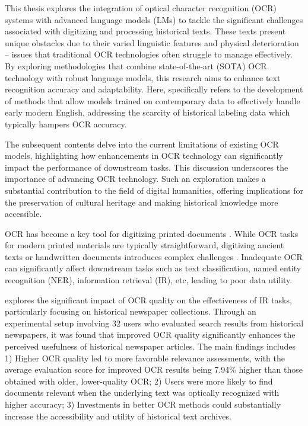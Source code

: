 \label{chap:1_introduction_and_motivation}
This thesis explores the integration of optical character recognition (OCR) systems with advanced language models (LMs) to tackle the significant challenges associated with digitizing and processing historical texts. These texts present unique obstacles due to their varied linguistic features and physical deterioration -- issues that traditional OCR technologies often struggle to manage effectively. By exploring methodologies that combine state-of-the-art (SOTA) OCR technology with robust language models, this research aims to enhance text recognition accuracy and adaptability. Here,  specifically refers to the development of methods that allow models trained on contemporary data to effectively handle early modern English, addressing the scarcity of historical labeling data which typically hampers OCR accuracy.

The subsequent contents delve into the current limitations of existing OCR models, highlighting how enhancements in OCR technology can significantly impact the performance of downstream tasks. This discussion underscores the importance of advancing OCR technology. Such an exploration makes a substantial contribution to the field of digital humanities, offering implications for the preservation of cultural heritage and making historical knowledge more accessible.

OCR has become a key tool for digitizing printed documents \citep{singh2012survey}. While OCR tasks for modern printed materials are typically straightforward, digitizing ancient texts or handwritten documents introduces complex challenges \citep{neudecker2019ocr}. Inadequate OCR can significantly affect downstream tasks such as text classification, named entity recognition (NER), information retrieval (IR), etc, leading to poor data utility. 

\cite{kettunen2022ocr} explores the significant impact of OCR quality on the effectiveness of IR tasks, particularly focusing on historical newspaper collections. Through an experimental setup involving 32 users who evaluated search results from historical newspapers, it was found that improved OCR quality significantly enhances the perceived usefulness of historical newspaper articles. The main findings includes 1) Higher OCR quality led to more favorable relevance assessments, with the average evaluation score for improved OCR results being 7.94\% higher than those obtained with older, lower-quality OCR; 2) Users were more likely to find documents relevant when the underlying text was optically recognized with higher accuracy; 3) Investments in better OCR methods could substantially increase the accessibility and utility of historical text archives.

